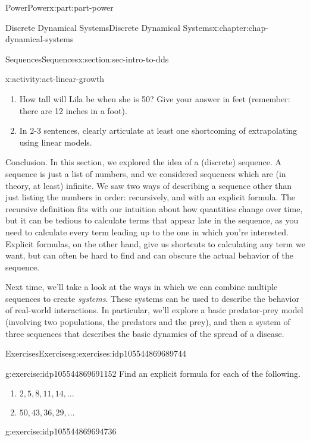 \documentclass[oneside,10pt,]{book}
\numberwithin{equation}{section}
\begin{document}
\begin{partptx}{Power}{}{Power}{}{}{x:part:part-power}
\begin{chapterptx}{Discrete Dynamical Systems}{}{Discrete Dynamical Systems}{}{}{x:chapter:chap-dynamical-systems}
\begin{sectionptx}{Sequences}{}{Sequences}{}{}{x:section:sec-intro-to-dds}
\begin{activity}{}{x:activity:act-linear-growth}
\begin{enumerate}
\item{}How tall will Lila be when she is 50? Give your answer in feet (remember: there are 12 inches in a foot).%
\item{}In 2-3 sentences, clearly articulate at least one shortcoming of extrapolating using linear models.%
\end{enumerate}
\end{activity}%
\begin{conclusion}{Conclusion.}%
In this section, we explored the idea of a (discrete) sequence. A sequence is just a list of numbers, and we considered sequences which are (in theory, at least) infinite. We saw two ways of describing a sequence other than just listing the numbers in order: recursively, and with an explicit formula. The recursive definition fits with our intuition about how quantities change over time, but it can be tedious to calculate terms that appear late in the sequence, as you need to calculate every term leading up to the one in which you're interested. Explicit formulas, on the other hand, give us shortcuts to calculating any term we want, but can often be hard to find and can obscure the actual behavior of the sequence.%
\par
Next time, we'll take a look at the ways in which we can combine multiple sequences to create \emph{systems}. These systems can be used to describe the behavior of real-world interactions. In particular, we'll explore a basic predator-prey model (involving two populations, the predators and the prey), and then a system of three sequences that describes the basic dynamics of the spread of a disease.%
\end{conclusion}%
%
%
\typeout{************************************************}
\typeout{************************************************}
%
\begin{exercises-subsection-numberless}{Exercises}{}{Exercises}{}{}{g:exercises:idp105544869689744}
\begin{divisionexercise}{1}{}{}{g:exercise:idp105544869691152}%
Find an explicit formula for each of the following.%
%
\begin{enumerate}[label=(\alph*)]
\item{}\(\displaystyle 2, 5, 8, 11, 14, \ldots\)%
\item{}\(\displaystyle 50, 43, 36, 29, \ldots\)%
\end{enumerate}
\end{divisionexercise}%
\begin{divisionexercise}{2}{}{}{g:exercise:idp105544869694736}%

\end{divisionexercise}
\end{exercises-subsection-numberless}
\end{sectionptx}
\end{chapterptx}
\end{partptx}
\end{document}
